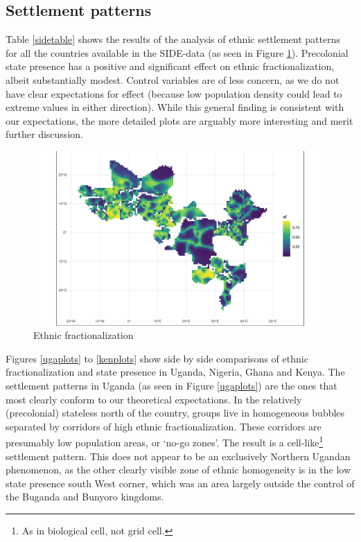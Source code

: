 \subsection{Settlement patterns} \label{Settlement patterns}

Table \ref{sidetable} shows the results of the analysis of ethnic settlement
patterns for all the countries available in the SIDE-data (as seen in Figure
\ref{ethplot}). Precolonial state presence has a positive and significant effect on
ethnic fractionalization, albeit substantially modest. Control variables are of
less concern, as we do not have clear expectations for effect (because low
population density could lead to extreme values in either direction). While this
general finding is consistent with our expectations, the more detailed plots are
arguably more interesting and merit further discussion.

\begin{figure}[htpb]
	\centering
	\includegraphics[width=1\linewidth]{R/Output/ethplot.pdf}
	\caption{Ethnic fractionalization}%
	\label{ethplot}
\end{figure}

Figures \ref{ugaplots} to \ref{kenplots} show side by side comparisons of ethnic
fractionalization and state presence in Uganda, Nigeria, Ghana and Kenya. The
settlement patterns in Uganda  (as seen in Figure \ref{ugaplots}) are the ones
that most clearly conform to our theoretical expectations. In the relatively
(precolonial) stateless north of the country, groups live in homogeneous bubbles
separated by corridors of high ethnic fractionalization. These corridors are
presumably low population areas, or `no-go zones'. The result is a
cell-like\footnote{As in biological cell, not grid cell.} settlement pattern.
This does not appear to be an exclusively Northern Ugandan phenomenon, as the
other clearly visible zone of ethnic homogeneity is in the low state presence
south West corner, which was an area largely outside the control of the Buganda
and Bunyoro kingdoms.

